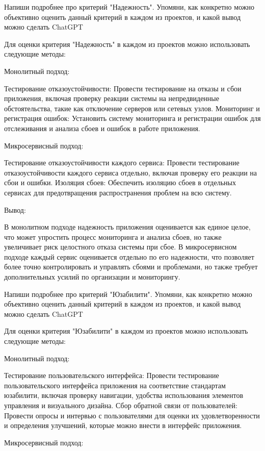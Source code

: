 Напиши подробнее про критерий "Надежность". Упомяни, как конкретно можно объективно оценить данный критерий в каждом из проектов, и какой вывод можно сделать
ChatGPT

Для оценки критерия "Надежность" в каждом из проектов можно использовать следующие методы:

Монолитный подход:

    Тестирование отказоустойчивости: Провести тестирование на отказы и сбои приложения, включая проверку реакции системы на непредвиденные обстоятельства, такие как отключение серверов или сетевых узлов.
    Мониторинг и регистрация ошибок: Установить систему мониторинга и регистрации ошибок для отслеживания и анализа сбоев и ошибок в работе приложения.

Микросервисный подход:

    Тестирование отказоустойчивости каждого сервиса: Провести тестирование отказоустойчивости каждого сервиса отдельно, включая проверку его реакции на сбои и ошибки.
    Изоляция сбоев: Обеспечить изоляцию сбоев в отдельных сервисах для предотвращения распространения проблем на всю систему.

Вывод:

    В монолитном подходе надежность приложения оценивается как единое целое, что может упростить процесс мониторинга и анализа сбоев, но также увеличивает риск целостного отказа системы при сбое.
    В микросервисном подходе каждый сервис оценивается отдельно по его надежности, что позволяет более точно контролировать и управлять сбоями и проблемами, но также требует дополнительных усилий по организации и мониторингу.

Напиши подробнее про критерий "Юзабилити". Упомяни, как конкретно можно объективно оценить данный критерий в каждом из проектов, и какой вывод можно сделать
ChatGPT

Для оценки критерия "Юзабилити" в каждом из проектов можно использовать следующие методы:

Монолитный подход:

    Тестирование пользовательского интерфейса: Провести тестирование пользовательского интерфейса приложения на соответствие стандартам юзабилити, включая проверку навигации, удобства использования элементов управления и визуального дизайна.
    Сбор обратной связи от пользователей: Провести опросы и интервью с пользователями для оценки их удовлетворенности и определения улучшений, которые можно внести в интерфейс приложения.

Микросервисный подход:

